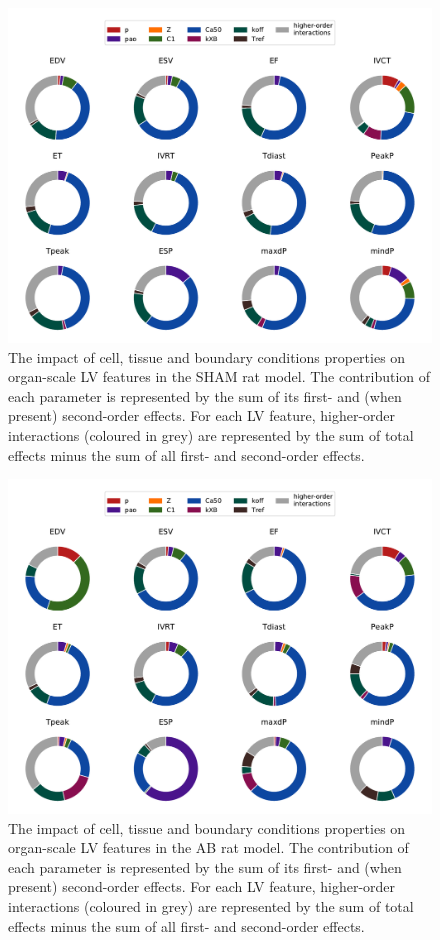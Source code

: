 \begin{figure}[!ht]
    \myfloatalign
    \includegraphics[width=\textwidth]{figures/chapter04/gsa_sham.pdf}
    \caption{The impact of cell, tissue and boundary conditions properties on organ-scale LV features in the SHAM rat model. The contribution of each parameter is represented by the sum of its first- and (when present) second-order effects. For each LV feature, higher-order interactions (coloured in grey) are represented by the sum of total effects minus the sum of all first- and second-order effects.}
    \label{fig:shamgsa}
\end{figure}

\begin{figure}[!ht]
    \myfloatalign
    \includegraphics[width=\textwidth]{figures/chapter04/gsa_ab.pdf}
    \caption{The impact of cell, tissue and boundary conditions properties on organ-scale LV features in the AB rat model. The contribution of each parameter is represented by the sum of its first- and (when present) second-order effects. For each LV feature, higher-order interactions (coloured in grey) are represented by the sum of total effects minus the sum of all first- and second-order effects.}
    \label{fig:abgsa}
\end{figure}

